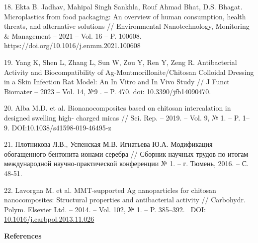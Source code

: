 \begin{references}
18. Ekta B. Jadhav, Mahipal Singh Sankhla, Rouf Ahmad Bhat, D.S. Bhagat.
Microplastics from food packaging: An overview of human consumption,
health threats, and alternative solutions // Environmental
Nanotechnology, Monitoring \& Management -- 2021 -- Vol. 16 -- P.
100608. \\https://doi.org/10.1016/j.enmm.2021.100608

19. Yang K, Shen L, Zhang L, Sun W, Zou Y, Ren Y, Zeng R. Antibacterial
Activity and Biocompatibility of Ag-Montmorillonite/Chitosan Colloidal
Dressing in a Skin Infection Rat Model: An In Vitro and In Vivo Study
// J Funct Biomater -- 2023 -- Vol. 14, №9 . -- P. 470. doi:
10.3390/jfb14090470.

20. Alba M.D. et al. Bionanocomposites based on chitosan intercalation in
designed swelling high- charged micas // Sci. Rep. -- 2019. -- Vol. 9,
№ 1. -- P. 1--9. DOI:10.1038/s41598-019-46495-z

21. Плотникова Л.В., Успенская М.В. Игнатьева Ю.А. Модификация
обогащенного бентонита ионами серебра // Сборник научных трудов по
итогам международной научно-практической конференции № 1. -- г.
Тюмень, 2016. -- С. 48-51.

22. Lavorgna M. et al. MMT-supported Ag nanoparticles for chitosan
nanocomposites: Structural properties and antibacterial activity //
Carbohydr. Polym. Elsevier Ltd. -- 2014. -- Vol. 102, № 1. -- P.
385--392. ~DOI:
\href{https://doi.org/10.1016/j.carbpol.2013.11.026}{10.1016/j.carbpol.2013.11.026}
\end{references}

\begin{center}
{\bfseries References}
\end{center}


